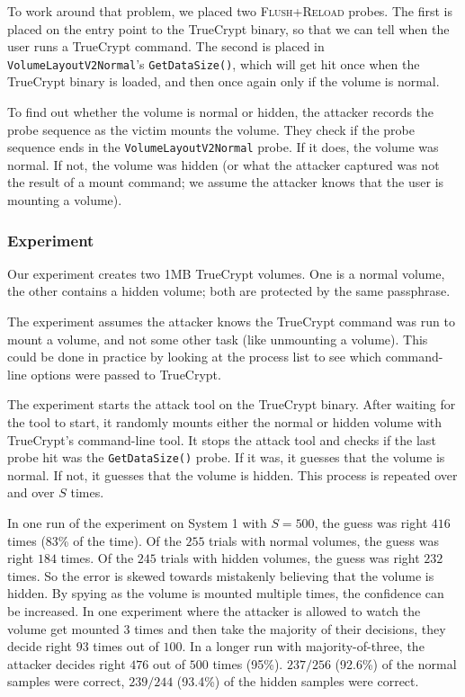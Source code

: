 \documentclass[letterpaper,twocolumn,10pt]{article}
\begin{document}
To work around that problem, we placed two \textsc{Flush+Reload} probes. The
first is placed on the entry point to the TrueCrypt binary, so that we can tell
when the user runs a TrueCrypt command. The second is placed in
\texttt{VolumeLayout\-V2Normal}'s \texttt{GetDataSize()}, which will get hit
once when the TrueCrypt binary is loaded, and then once again only if the volume
is normal.

To find out whether the volume is normal or hidden, the attacker records the
probe sequence as the victim mounts the volume. They check if the probe sequence
ends in the \texttt{VolumeLayout\-V2Normal} probe. If it does, the volume was
normal. If not, the volume was hidden (or what the attacker captured was not the
result of a mount command; we assume the attacker knows that the user is
mounting a volume).

\subsubsection{Experiment}

Our experiment creates two 1MB TrueCrypt volumes. One is a normal volume, the
other contains a hidden volume; both are protected by the same passphrase.

The experiment assumes the attacker knows the TrueCrypt command was run to mount
a volume, and not some other task (like unmounting a volume). This could be done
in practice by looking at the process list to see which command-line options
were passed to TrueCrypt.

The experiment starts the attack tool on the TrueCrypt binary. After waiting for
the tool to start, it randomly mounts either the normal or hidden volume with
TrueCrypt's command-line tool. It stops the attack tool and checks if the last
probe hit was the \texttt{GetDataSize()} probe. If it was, it guesses that the
volume is normal. If not, it guesses that the volume is hidden. This process is
repeated over and over $S$ times.

In one run of the experiment on System 1 with $S=500$,
the guess was right $416$ times (83\% of the time). Of the $255$ trials with
normal volumes, the guess was right $184$ times. Of the $245$ trials with hidden
volumes, the guess was right $232$ times. So the error is skewed towards
mistakenly believing that the volume is hidden. By spying as the volume is
mounted multiple times, the confidence can be increased. In one
experiment where the attacker is allowed to watch the
volume get mounted 3 times and then take the majority of their decisions, they
decide right $93$ times out of $100$. In a longer run
with majority-of-three, the attacker decides right $476$ out of $500$ times
(95\%). $237/256$ (92.6\%) of the normal samples were correct, $239/244$
(93.4\%) of the hidden samples were correct.
\end{document}
